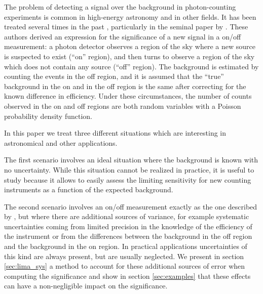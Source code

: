 \documentclass[twocolumn]{aastex61}
\renewcommand{\textbf}{}
\begin{document}
    The problem of detecting a signal over the background in photon-counting experiments is common in high-energy astronomy and in other fields. \textbf{It has been treated several times in the past} \citep[see for example][and references therein]{Cousins2008}, particularly in the seminal paper by \citet{LiMa}. These authors derived an expression for the significance of a new signal in a on/off measurement: a photon detector observes a region of the sky where a new source is suspected to exist (``on'' region), and then turns to observe a region of the sky which does not contain any source (``off'' region). The background is estimated by counting the events in the off region, and it is assumed that the ``true'' background in the on and in the off region is the same after correcting for the known difference in efficiency. Under these circumstances, the number of counts observed in the on and off regions are both random variables with a Poisson probability density function. 

    In this paper we treat three different situations which are interesting in astronomical and other applications. 
 
The first scenario involves an ideal situation where the background is known with no uncertainty. While this situation cannot be realized in practice, it is useful to study because it allows to easily assess the limiting sensitivity for new counting instruments as a function of the expected background.
 
The second scenario involves an on/off measurement exactly as the one described by \citet{LiMa}, but where there are additional sources of variance, for example systematic uncertainties coming from limited precision in the knowledge of the efficiency of the instrument or from the differences between the background in the off region and the background in the on region. In practical applications uncertainties of this kind are always present, but  are usually neglected. We present in section \ref{sec:lima_sys} a method to account for these additional sources of error when computing the significance and show in section \ref{sec:examples} that these effects can have a non-negligible impact on the significance.
\end{document}

